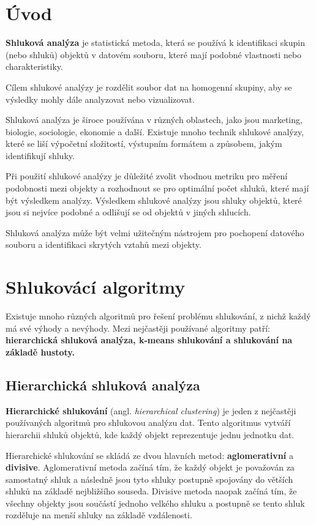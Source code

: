 \documentclass[czech,bachelor]{seminarka}
\begin{document}
\MakeTitlePages

\listoffigures
\clearpage

\listoftables
\clearpage

\chapter{Úvod}

\textbf{Shluková analýza} je statistická metoda, která se používá k identifikaci skupin (nebo shluků) objektů v datovém souboru, které mají podobné vlastnosti nebo charakteristiky. 

Cílem shlukové analýzy je rozdělit soubor dat na homogenní skupiny, aby se výsledky mohly dále analyzovat nebo vizualizovat.

Shluková analýza je široce používána v různých oblastech, jako jsou marketing, biologie, sociologie, ekonomie a další. Existuje mnoho technik shlukové analýzy, které se liší výpočetní složitostí, výstupním formátem a způsobem, jakým identifikují shluky.

Při použití shlukové analýzy je důležité zvolit vhodnou metriku pro měření podobnosti mezi objekty a rozhodnout se pro optimální počet shluků, které mají být výsledkem analýzy. Výsledkem shlukové analýzy jsou shluky objektů, které jsou si nejvíce podobné a odlišují se od objektů v jiných shlucích.

Shluková analýza může být velmi užitečným nástrojem pro pochopení datového souboru a identifikaci skrytých vztahů mezi objekty.
\chapter{Shlukovácí algoritmy}

Existuje mnoho různých algoritmů pro řešení problému shlukování, z nichž každý má své výhody a nevýhody. Mezi nejčastěji používané algoritmy patří: \textbf{hierarchická shluková analýza, k-means shlukování a shlukování na základě hustoty.}
\section{Hierarchická shluková analýza}

\textbf{Hierarchické shlukování} (angl. \textit{hierarchical clustering}) je jeden z nejčastěji používaných algoritmů pro shlukovou analýzu dat. Tento algoritmus vytváří hierarchii shluků objektů, kde každý objekt reprezentuje jednu jednotku dat.

Hierarchické shlukování se skládá ze dvou hlavních metod: \textbf{aglomerativní} a \textbf{divisive}. Aglomerativní metoda začíná tím, že každý objekt je považován za samostatný shluk a následně jsou tyto shluky postupně spojovány do větších shluků na základě nejbližšího souseda. Divisive metoda naopak začíná tím, že všechny objekty jsou součástí jednoho velkého shluku a postupně se tento shluk rozděluje na menší shluky na základě vzdálenosti.
\end{document}

